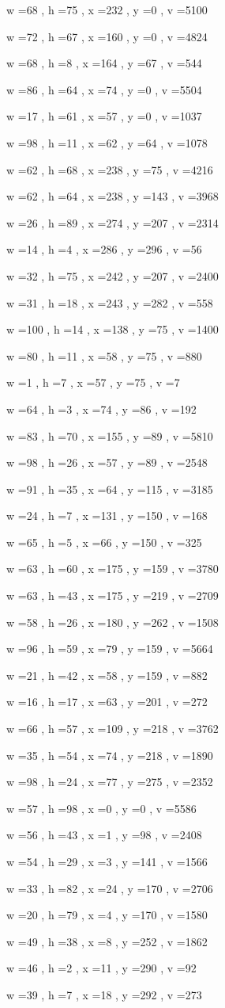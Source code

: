 \documentclass[11pt]{article}
\begin{document}
w =68 , h =75 , x =232 , y =0 , v =5100
\par
w =72 , h =67 , x =160 , y =0 , v =4824
\par
w =68 , h =8 , x =164 , y =67 , v =544
\par
w =86 , h =64 , x =74 , y =0 , v =5504
\par
w =17 , h =61 , x =57 , y =0 , v =1037
\par
w =98 , h =11 , x =62 , y =64 , v =1078
\par
w =62 , h =68 , x =238 , y =75 , v =4216
\par
w =62 , h =64 , x =238 , y =143 , v =3968
\par
w =26 , h =89 , x =274 , y =207 , v =2314
\par
w =14 , h =4 , x =286 , y =296 , v =56
\par
w =32 , h =75 , x =242 , y =207 , v =2400
\par
w =31 , h =18 , x =243 , y =282 , v =558
\par
w =100 , h =14 , x =138 , y =75 , v =1400
\par
w =80 , h =11 , x =58 , y =75 , v =880
\par
w =1 , h =7 , x =57 , y =75 , v =7
\par
w =64 , h =3 , x =74 , y =86 , v =192
\par
w =83 , h =70 , x =155 , y =89 , v =5810
\par
w =98 , h =26 , x =57 , y =89 , v =2548
\par
w =91 , h =35 , x =64 , y =115 , v =3185
\par
w =24 , h =7 , x =131 , y =150 , v =168
\par
w =65 , h =5 , x =66 , y =150 , v =325
\par
w =63 , h =60 , x =175 , y =159 , v =3780
\par
w =63 , h =43 , x =175 , y =219 , v =2709
\par
w =58 , h =26 , x =180 , y =262 , v =1508
\par
w =96 , h =59 , x =79 , y =159 , v =5664
\par
w =21 , h =42 , x =58 , y =159 , v =882
\par
w =16 , h =17 , x =63 , y =201 , v =272
\par
w =66 , h =57 , x =109 , y =218 , v =3762
\par
w =35 , h =54 , x =74 , y =218 , v =1890
\par
w =98 , h =24 , x =77 , y =275 , v =2352
\par
w =57 , h =98 , x =0 , y =0 , v =5586
\par
w =56 , h =43 , x =1 , y =98 , v =2408
\par
w =54 , h =29 , x =3 , y =141 , v =1566
\par
w =33 , h =82 , x =24 , y =170 , v =2706
\par
w =20 , h =79 , x =4 , y =170 , v =1580
\par
w =49 , h =38 , x =8 , y =252 , v =1862
\par
w =46 , h =2 , x =11 , y =290 , v =92
\par
w =39 , h =7 , x =18 , y =292 , v =273
\par
\newpage
\end{document}
